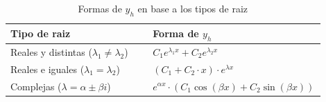 \begin{table}[H]
\centering
\caption{Formas de $y_{h}$ en base a los tipos de raiz}
\begin{threeparttable}
{
\begin{tabular}{p{0.45\linewidth}p{0.45\linewidth}}\hline
    
    \textbf{Tipo de raiz} & \textbf{Forma de $y_{h}$} \\ \hline
    
    Reales y distintas ($\lambda_{1} \neq \lambda_{2}$) & $C_{1}e^{\lambda_{1}x} + C_{2}e^{\lambda_{2}x}$ \\
    Reales e iguales ($\lambda_{1} = \lambda_{2}$) & $(C_{1} + C_{2} \cdot x) \cdot e^{\lambda x}$ \\
    Complejas ($\lambda = \alpha \pm \beta i$) & $e^{\alpha x} \cdot (C_{1}\cos{(\beta x)} + C_{2}\sin{(\beta x)})$ \\
    
    \hline
\end{tabular}
}
\begin{tablenotes} %
    \item[] 
\end{tablenotes}
\end{threeparttable}
\label{tab:eq_segundo_orden}
\end{table}